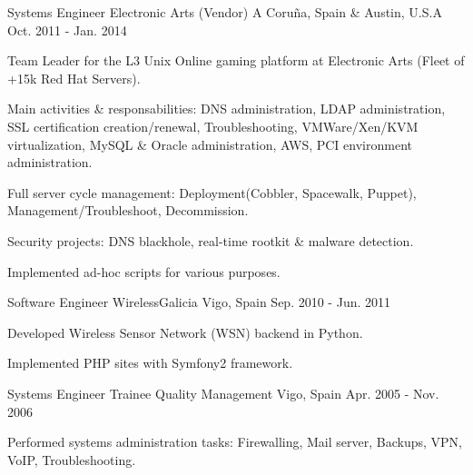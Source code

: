 \begin{cventries}
{    }
  \cventry
    {Systems Engineer} %
    {Electronic Arts (Vendor)} %
    {A Coruña, Spain \& Austin, U.S.A} %
    {Oct. 2011 - Jan. 2014} %
    {
      \begin{cvitems} %
        \item {Team Leader for the L3 Unix Online gaming platform at Electronic Arts (Fleet of +15k Red Hat Servers).}
        \item {Main activities \& responsabilities: DNS administration, LDAP administration, SSL certification creation/renewal, Troubleshooting, VMWare/Xen/KVM virtualization, MySQL \& Oracle administration, AWS, PCI environment administration. }
	\item {Full server cycle management: Deployment(Cobbler, Spacewalk, Puppet), Management/Troubleshoot, Decommission.} 
	\item {Security projects: DNS blackhole, real-time rootkit \& malware detection.} 
	\item {Implemented ad-hoc scripts for various purposes.} 
      \end{cvitems}
    }
  \cventry
    {Software Engineer} %
    {WirelessGalicia} %
    {Vigo, Spain} %
    {Sep. 2010 - Jun. 2011} %
    {
      \begin{cvitems} %
        \item {Developed Wireless Sensor Network (WSN) backend in Python.}
        \item {Implemented PHP sites with Symfony2 framework.}
      \end{cvitems} 
    }
  \cventry
    {Systems Engineer Trainee} %
    {Quality Management} %
    {Vigo, Spain} %
    {Apr. 2005 - Nov. 2006} %
    {
      \begin{cvitems} %
        \item {Performed systems administration tasks: Firewalling, Mail server, Backups, VPN, VoIP, Troubleshooting.}
      \end{cvitems}
    }

\end{cventries}

